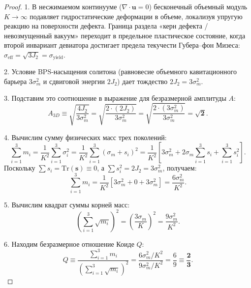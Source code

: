 \documentclass[12pt,a4paper]{article}
\begin{document}
	\begin{proof}
		1. В несжимаемом континууме ($\nabla \cdot \mathbf{u} = 0$) бесконечный объемный модуль $K \to \infty$ подавляет гидростатические деформации в объеме, локализуя упругую реакцию на поверхности дефекта. Граница раздела «керн дефекта / невозмущенный вакуум» переходит в предельное пластическое состояние, когда второй инвариант девиатора достигает предела текучести Губера--фон Мизеса: $\sigma_{\text{eff}} = \sqrt{3 J_2} = \sigma_{\text{yield}}$.
		
		2. Условие BPS-насыщения солитона (равновесие объемного кавитационного барьера $3\sigma_m^2$ и сдвиговой энергии $2J_2$) дает тождество $2 J_2 = 3 \sigma_m^2$.
		
		3. Подставим это соотношение в выражение для безразмерной амплитуды $A$:
		\begin{equation}
			A_{3D} \equiv \sqrt{\frac{4 J_2}{3 \sigma_m^2}} = \sqrt{\frac{2 \cdot (2 J_2)}{3 \sigma_m^2}} = \sqrt{\frac{2 \cdot (3 \sigma_m^2)}{3 \sigma_m^2}} = \mathbf{\sqrt{2}}.
		\end{equation}
		
		4. Вычислим сумму физических масс трех поколений:
		\begin{equation}
			\sum_{i=1}^3 m_i = \frac{1}{K^2} \sum_{i=1}^3 \sigma_i^2 = \frac{1}{K^2} \sum_{i=1}^3 (\sigma_m + s_i)^2 = \frac{1}{K^2} \left[ 3 \sigma_m^2 + 2\sigma_m \sum_{i=1}^3 s_i + \sum_{i=1}^3 s_i^2 \right].
		\end{equation}
		Поскольку $\sum s_i = \mathrm{Tr}(\mathbf{s}) \equiv 0$, а $\sum s_i^2 = 2 J_2 = 3 \sigma_m^2$, получаем:
		\begin{equation}
			\sum_{i=1}^3 m_i = \frac{1}{K^2} \left[ 3 \sigma_m^2 + 0 + 3 \sigma_m^2 \right] = \frac{6 \sigma_m^2}{K^2}.
		\end{equation}
		
		5. Вычислим квадрат суммы корней масс:
		\begin{equation}
			\left( \sum_{i=1}^3 \sqrt{m_i} \right)^2 = \left( \frac{3 \sigma_m}{K} \right)^2 = \frac{9 \sigma_m^2}{K^2}.
		\end{equation}
		
		6. Находим безразмерное отношение Коиде $Q$:
		\begin{equation}
			Q \equiv \frac{\sum_{i=1}^3 m_i}{\left( \sum_{i=1}^3 \sqrt{m_i} \right)^2} = \frac{6 \sigma_m^2 / K^2}{9 \sigma_m^2 / K^2} = \frac{6}{9} \equiv \mathbf{\frac{2}{3}}.
		\end{equation}
	\end{proof}
	
\end{document}
